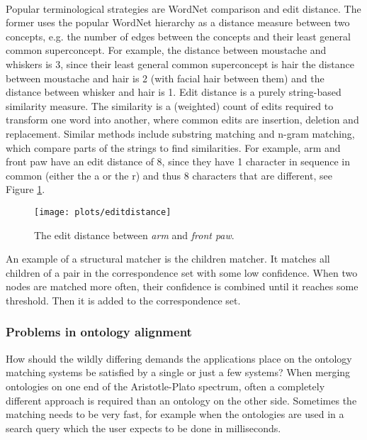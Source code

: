 \documentclass{article}
\begin{document}
 \paragraph{}
 Popular terminological strategies are WordNet comparison and edit distance. The former uses the popular WordNet hierarchy as a distance measure between two concepts, e.g. the number of edges between the concepts and their least general common superconcept\cite{lin2008}.
 For example, the distance between moustache and whiskers is 3, since their least general common superconcept is hair the distance between moustache and hair is 2 (with facial hair between them) and the distance between whisker and hair is 1.
 Edit distance is a purely string-based similarity measure. The similarity is a (weighted) count of edits required to transform one word into another, where common edits are insertion, deletion and replacement. Similar methods include substring matching and n-gram matching, which compare parts of the strings to find similarities\cite{singh2014, levenshtein}.
 For example, arm and front paw have an edit distance of 8, since they have 1 character in sequence in common (either the a or the r) and thus 8 characters that are different, see Figure \ref{levenshteinfig}.
 
 \begin{figure}[H]
 \centering
 \texttt{[image: plots/editdistance]}
 \caption[Edit distance example]{The edit distance between \textit{arm} and \textit{front paw}.}
 \label{levenshteinfig}
 \end{figure}
 
 An example of a structural matcher is the children matcher. It matches all children of a pair in the correspondence set with some low confidence. When two nodes are matched more often, their confidence is combined until it reaches some threshold. Then it is added to the correspondence set.
 
 \subsubsection{Problems in ontology alignment}
 How should the wildly differing demands the applications place on the ontology matching systems be satisfied by a single or just a few systems? When merging ontologies on one end of the Aristotle-Plato spectrum, often a completely different approach is required than an ontology on the other side. Sometimes the matching needs to be very fast, for example when the ontologies are used in a search query which the user expects to be done in milliseconds.
\end{document}
